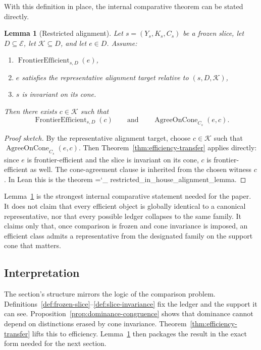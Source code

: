 \documentclass[11pt]{article}
\newtheorem{lemma}{Lemma}
\newcommand{\lid}[1]{{\small\ttfamily\hyphenchar\font=`\_ #1}}
\begin{document}
With this definition in place, the internal comparative theorem can be stated directly.

\begin{lemma}[Restricted alignment]\label{lem:restricted-alignment}
Let \(s=(Y_s,K_s,C_s)\) be a frozen slice, let \(D\subseteq \mathcal{E}\), let \(\mathcal{K}\subseteq D\), and let \(e\in D\). Assume:
\begin{enumerate}
\item \(\operatorname{FrontierEfficient}_{s,D}(e)\),
\item \(e\) satisfies the representative alignment target relative to \((s,D,\mathcal{K})\),
\item \(s\) is invariant on its cone.
\end{enumerate}
Then there exists \(c\in\mathcal{K}\) such that
\[
\operatorname{FrontierEfficient}_{s,D}(c)
\qquad\text{and}\qquad
\operatorname{AgreeOnCone}_{C_s}(e,c).
\]
\end{lemma}

\begin{proof}[Proof sketch]
By the representative alignment target, choose \(c\in\mathcal{K}\) such that \(\operatorname{AgreeOnCone}_{C_s}(e,c)\). Then Theorem~\ref{thm:efficiency-transfer} applies directly: since \(e\) is frontier-efficient and the slice is invariant on its cone, \(c\) is frontier-efficient as well. The cone-agreement clause is inherited from the chosen witness \(c\). In Lean this is the theorem \lid{restricted\_in\_house\_alignment\_lemma}.
\end{proof}

Lemma~\ref{lem:restricted-alignment} is the strongest internal comparative statement needed for the paper. It does not claim that every efficient object is globally identical to a canonical representative, nor that every possible ledger collapses to the same family. It claims only that, once comparison is frozen and cone invariance is imposed, an efficient class admits a representative from the designated family on the support cone that matters.

\subsection*{Interpretation}

The section's structure mirrors the logic of the comparison problem. Definitions~\ref{def:frozen-slice}--\ref{def:slice-invariance} fix the ledger and the support it can see. Proposition~\ref{prop:dominance-congruence} shows that dominance cannot depend on distinctions erased by cone invariance. Theorem~\ref{thm:efficiency-transfer} lifts this to efficiency. Lemma~\ref{lem:restricted-alignment} then packages the result in the exact form needed for the next section.
\end{document}

